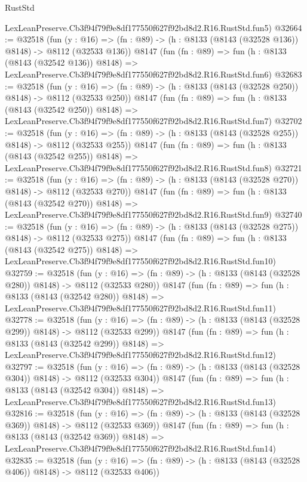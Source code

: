 \begin{lexlean}{RustStd}
\begin{coremodule}
    LexLeanPreserve.Cb3f94f79f9e8df177550f627f92bd8d2.R16.RustStd.fun5)
@32664 := @32518
    (fun (y : @16) => (fn : @89) -> (h : @8133 (@8143 (@32528 @136)) @8148) -> @8112 (@32533 @136))
    @8147
    (fun (fn : @89) =>
    fun (h : @8133 (@8143 (@32542 @136)) @8148) =>
    LexLeanPreserve.Cb3f94f79f9e8df177550f627f92bd8d2.R16.RustStd.fun6)
@32683 := @32518
    (fun (y : @16) => (fn : @89) -> (h : @8133 (@8143 (@32528 @250)) @8148) -> @8112 (@32533 @250))
    @8147
    (fun (fn : @89) =>
    fun (h : @8133 (@8143 (@32542 @250)) @8148) =>
    LexLeanPreserve.Cb3f94f79f9e8df177550f627f92bd8d2.R16.RustStd.fun7)
@32702 := @32518
    (fun (y : @16) => (fn : @89) -> (h : @8133 (@8143 (@32528 @255)) @8148) -> @8112 (@32533 @255))
    @8147
    (fun (fn : @89) =>
    fun (h : @8133 (@8143 (@32542 @255)) @8148) =>
    LexLeanPreserve.Cb3f94f79f9e8df177550f627f92bd8d2.R16.RustStd.fun8)
@32721 := @32518
    (fun (y : @16) => (fn : @89) -> (h : @8133 (@8143 (@32528 @270)) @8148) -> @8112 (@32533 @270))
    @8147
    (fun (fn : @89) =>
    fun (h : @8133 (@8143 (@32542 @270)) @8148) =>
    LexLeanPreserve.Cb3f94f79f9e8df177550f627f92bd8d2.R16.RustStd.fun9)
@32740 := @32518
    (fun (y : @16) => (fn : @89) -> (h : @8133 (@8143 (@32528 @275)) @8148) -> @8112 (@32533 @275))
    @8147
    (fun (fn : @89) =>
    fun (h : @8133 (@8143 (@32542 @275)) @8148) =>
    LexLeanPreserve.Cb3f94f79f9e8df177550f627f92bd8d2.R16.RustStd.fun10)
@32759 := @32518
    (fun (y : @16) => (fn : @89) -> (h : @8133 (@8143 (@32528 @280)) @8148) -> @8112 (@32533 @280))
    @8147
    (fun (fn : @89) =>
    fun (h : @8133 (@8143 (@32542 @280)) @8148) =>
    LexLeanPreserve.Cb3f94f79f9e8df177550f627f92bd8d2.R16.RustStd.fun11)
@32778 := @32518
    (fun (y : @16) => (fn : @89) -> (h : @8133 (@8143 (@32528 @299)) @8148) -> @8112 (@32533 @299))
    @8147
    (fun (fn : @89) =>
    fun (h : @8133 (@8143 (@32542 @299)) @8148) =>
    LexLeanPreserve.Cb3f94f79f9e8df177550f627f92bd8d2.R16.RustStd.fun12)
@32797 := @32518
    (fun (y : @16) => (fn : @89) -> (h : @8133 (@8143 (@32528 @304)) @8148) -> @8112 (@32533 @304))
    @8147
    (fun (fn : @89) =>
    fun (h : @8133 (@8143 (@32542 @304)) @8148) =>
    LexLeanPreserve.Cb3f94f79f9e8df177550f627f92bd8d2.R16.RustStd.fun13)
@32816 := @32518
    (fun (y : @16) => (fn : @89) -> (h : @8133 (@8143 (@32528 @369)) @8148) -> @8112 (@32533 @369))
    @8147
    (fun (fn : @89) =>
    fun (h : @8133 (@8143 (@32542 @369)) @8148) =>
    LexLeanPreserve.Cb3f94f79f9e8df177550f627f92bd8d2.R16.RustStd.fun14)
@32835 := @32518
    (fun (y : @16) => (fn : @89) -> (h : @8133 (@8143 (@32528 @406)) @8148) -> @8112 (@32533 @406))

\end{coremodule}
\end{lexlean}
